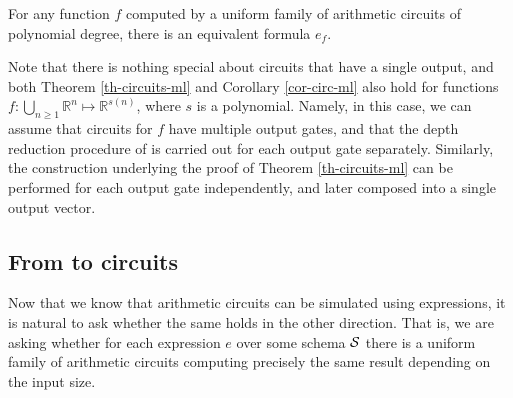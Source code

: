 
\begin{corollary}
\label{cor-circ-ml}
For any function $f$ computed by a uniform family of arithmetic circuits of polynomial degree, there is an equivalent \langfor formula $e_f$.
\end{corollary}


Note that there is nothing special about circuits that have a single output, and both Theorem \ref{th-circuits-ml} and Corollary \ref{cor-circ-ml} also hold for functions  $f:\bigcup_{n\geq 1} \mathbb{R}^n\mapsto\mathbb{R}^{s(n)}$, where $s$ is a polynomial. Namely, in this case, we can assume that circuits for $f$ have multiple output gates, and that the depth reduction procedure of \cite{AllenderJMV98} is carried out for each output gate separately. Similarly, the construction underlying the proof of Theorem \ref{th-circuits-ml} can be performed for each output gate independently, and later composed into a single output vector.

\subsection{From \langfor to circuits}

Now that we know that arithmetic circuits can be simulated using \langfor expressions, it is natural to ask whether the same holds in the other direction. That is, we are asking whether for each \langfor expression $e$ over some schema $\mathcal{S}$ there is a uniform family of arithmetic circuits computing precisely the same result depending on the input size. 


